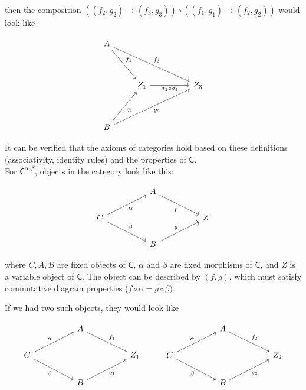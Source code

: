then the composition $((f_2, g_2) \rightarrow (f_3, g_3)) \circ ((f_1, g_1) \rightarrow (f_2, g_2))$ would look like

\[\begin{tikzcd}
	A \\
	\\
	& {Z_1} && {Z_3} \\
	\\
	B
	\arrow["{f_1}", from=1-1, to=3-2]
	\arrow["{f_3}", from=1-1, to=3-4]
	\arrow["{\sigma_2 \circ\sigma_1}"', from=3-2, to=3-4]
	\arrow["{g_1}"', from=5-1, to=3-2]
	\arrow["{g_3}"', from=5-1, to=3-4]
\end{tikzcd}\]

It can be verified that the axioms of categories hold based on these definitions (associativity, identity rules) and the properties of $\textsf{C}$. \\

For $\textsf{C}^{\alpha, \beta}$, objects in the category look like this:

\[\begin{tikzcd}
	&& A \\
	C &&&& Z \\
	&& B
	\arrow["f"', from=1-3, to=2-5]
	\arrow["\alpha"', from=2-1, to=1-3]
	\arrow["\beta", from=2-1, to=3-3]
	\arrow["g", from=3-3, to=2-5]
\end{tikzcd}\]

where $C, A, B$ are fixed objects of $\textsf{C}$, $\alpha$ and $\beta$ are fixed morphisms of $\textsf{C}$, and $Z$ is a variable object of $\textsf{C}$. The object can be described by $(f, g)$, which must satisfy commutative diagram properties ($f \circ \alpha = g \circ \beta)$. 

If we had two such objects, they would look like

\[\begin{tikzcd}
	&& A &&&&& A \\
	C &&&& {Z_1} & C &&&& {Z_2} \\
	&& B &&&&& B
	\arrow["{f_1}", from=1-3, to=2-5]
	\arrow["{f_2}", from=1-8, to=2-10]
	\arrow["\alpha", from=2-1, to=1-3]
	\arrow["\beta"', from=2-1, to=3-3]
	\arrow["\alpha", from=2-6, to=1-8]
	\arrow["\beta"', from=2-6, to=3-8]
	\arrow["{g_1}"', from=3-3, to=2-5]
	\arrow["{g_2}"', from=3-8, to=2-10]
\end{tikzcd}\]

